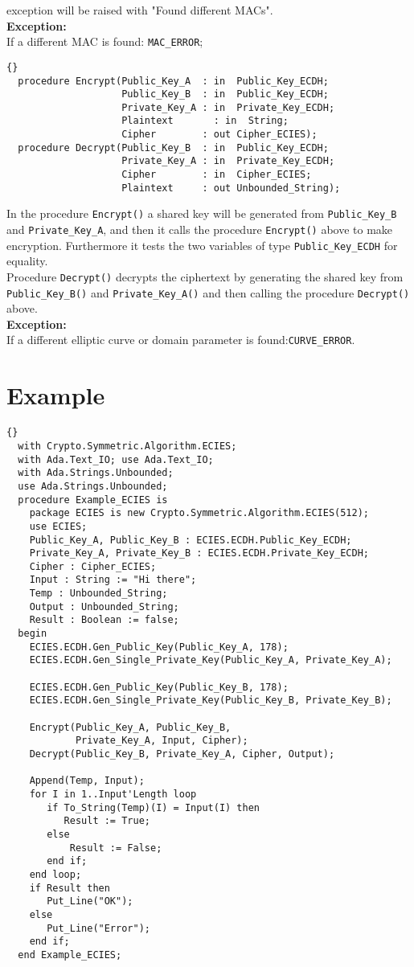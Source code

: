 exception will be raised with "Found different
MACs".\\ \textbf{Exception:}\\ If a different MAC is found:\quad
\texttt{MAC\_ERROR};\\ \hhline
\begin{lstlisting}{}
  procedure Encrypt(Public_Key_A  : in  Public_Key_ECDH;
                    Public_Key_B  : in  Public_Key_ECDH;
                    Private_Key_A : in  Private_Key_ECDH;
                    Plaintext	    : in  String;
                    Cipher        : out Cipher_ECIES);
  procedure Decrypt(Public_Key_B  : in  Public_Key_ECDH;
                    Private_Key_A : in  Private_Key_ECDH;
                    Cipher        : in  Cipher_ECIES;
                    Plaintext     : out Unbounded_String);
\end{lstlisting}
In the procedure \texttt{Encrypt()} a shared key will be generated
from \texttt{Public\_Key\_B} and \texttt{Private\-\_Key\_A}, and then
it calls the procedure \texttt{Encrypt()} above to make
encryption. Furthermore it tests the two variables of type
\texttt{Public\_Key\_ECDH} for equality.\\
Procedure \texttt{Decrypt()} decrypts the ciphertext by generating the
shared key from \texttt{Public\_K\-ey\_B()} and
\texttt{Private\_Key\_A()} and then calling the procedure
\texttt{Decrypt()} above.\\
\textbf{Exception:}\\ If a different elliptic curve or domain
parameter is found:\quad \texttt{CURVE\_ERROR}.
\section{Example}
\begin{lstlisting}{}
  with Crypto.Symmetric.Algorithm.ECIES;
  with Ada.Text_IO; use Ada.Text_IO;
  with Ada.Strings.Unbounded;
  use Ada.Strings.Unbounded;
  procedure Example_ECIES is
    package ECIES is new Crypto.Symmetric.Algorithm.ECIES(512);
    use ECIES;
    Public_Key_A, Public_Key_B : ECIES.ECDH.Public_Key_ECDH;
    Private_Key_A, Private_Key_B : ECIES.ECDH.Private_Key_ECDH;
    Cipher : Cipher_ECIES;
    Input : String := "Hi there";
    Temp : Unbounded_String;
    Output : Unbounded_String;
    Result : Boolean := false;
  begin
    ECIES.ECDH.Gen_Public_Key(Public_Key_A, 178);
    ECIES.ECDH.Gen_Single_Private_Key(Public_Key_A, Private_Key_A);

    ECIES.ECDH.Gen_Public_Key(Public_Key_B, 178);
    ECIES.ECDH.Gen_Single_Private_Key(Public_Key_B, Private_Key_B);

    Encrypt(Public_Key_A, Public_Key_B, 
            Private_Key_A, Input, Cipher);
    Decrypt(Public_Key_B, Private_Key_A, Cipher, Output);

    Append(Temp, Input);
    for I in 1..Input'Length loop
       if To_String(Temp)(I) = Input(I) then
          Result := True;
       else
	       Result := False;
       end if;
    end loop;
    if Result then
       Put_Line("OK");
    else
       Put_Line("Error");
    end if;
  end Example_ECIES;
\end{lstlisting}
